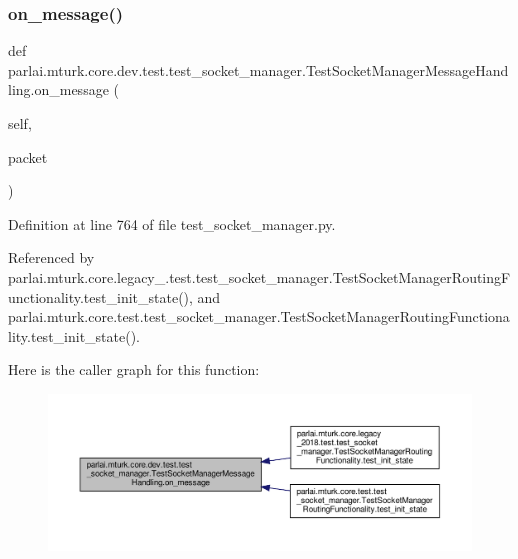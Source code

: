 \subsubsection{\texorpdfstring{on\+\_\+message()}{on\_message()}}
{\footnotesize\ttfamily def parlai.\+mturk.\+core.\+dev.\+test.\+test\+\_\+socket\+\_\+manager.\+Test\+Socket\+Manager\+Message\+Handling.\+on\+\_\+message (\begin{DoxyParamCaption}\item[{}]{self,  }\item[{}]{packet }\end{DoxyParamCaption})}



Definition at line 764 of file test\+\_\+socket\+\_\+manager.\+py.



Referenced by parlai.\+mturk.\+core.\+legacy\+\_.\+test.\+test\+\_\+socket\+\_\+manager.\+Test\+Socket\+Manager\+Routing\+Functionality.\+test\+\_\+init\+\_\+state(), and parlai.\+mturk.\+core.\+test.\+test\+\_\+socket\+\_\+manager.\+Test\+Socket\+Manager\+Routing\+Functionality.\+test\+\_\+init\+\_\+state().

Here is the caller graph for this function\+:
\nopagebreak
\begin{figure}[H]
\begin{center}
\leavevmode
\includegraphics[width=350pt]{classparlai_1_1mturk_1_1core_1_1dev_1_1test_1_1test__socket__manager_1_1TestSocketManagerMessageHandling_a01ca2d8b51911eb2e930dd44cdae1185_icgraph}
\end{center}
\end{figure}
\mbox{\label{classparlai_1_1mturk_1_1core_1_1dev_1_1test_1_1test__socket__manager_1_1TestSocketManagerMessageHandling_aa370a7cf8fc2cb4180cf28a06b057d5b}} 
